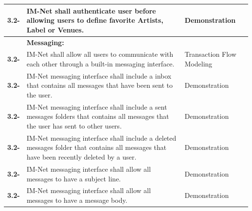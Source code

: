 \documentclass[letterpaper,12pt]{article}
\newcounter{rcounter}							%
\newcommand\rnumber{\stepcounter{rcounter}\arabic{rcounter}}
\begin{document}
{\begin{center}
\begin{tabular}{|l|p{4in}|p{2in}|}
\hline 
\textbf{3.2-\rnumber} & IM-Net shall authenticate user before allowing users to define favorite Artists, Label or Venues. & Demonstration \\ 
\hline 
& \textbf{Messaging:} & \\
\hline
\textbf{3.2-\rnumber} & IM-Net shall allow all users to communicate with each other through a built-in messaging interface. & Transaction Flow Modeling \\ 
\hline 
\textbf{3.2-\rnumber} & IM-Net messaging interface shall include a inbox that contains all messages that have been sent to the user. & Demonstration \\ 
\hline 
\textbf{3.2-\rnumber} & IM-Net messaging interface shall include a sent messages folders that contains all messages that the user has sent to other users. & Demonstration \\ 
\hline 
\textbf{3.2-\rnumber} & IM-Net messaging interface shall include a deleted messages folder that contains all messages that have been recently deleted by a user. & Demonstration \\ 
\textbf{3.2-\rnumber} & IM-Net messaging interface shall allow all messages to have a subject line. & Demonstration \\ 
\hline 
\textbf{3.2-\rnumber} & IM-Net messaging interface shall allow all messages to have a message body. & Demonstration \\ 
\hline 
\end{tabular} 
\end{center}

}
\end{document}

